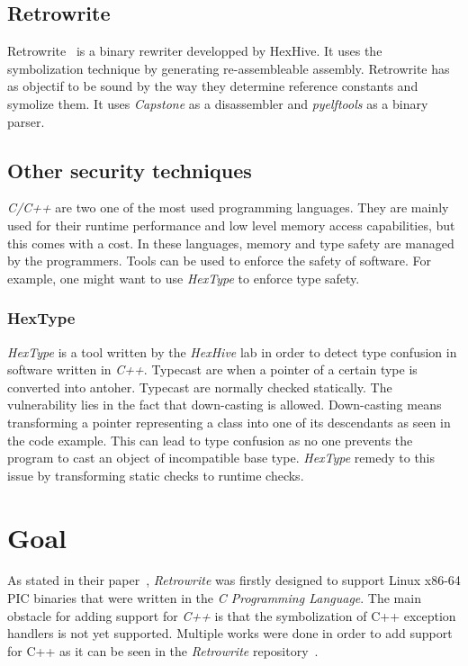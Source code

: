 \documentclass[a4paper,11pt,oneside]{report}
\begin{document}
\section{Retrowrite}
Retrowrite~\cite{dinesh20oakland} is a binary rewriter developped by HexHive.
It uses the symbolization technique by generating re-assembleable assembly.
Retrowrite has as objectif to be sound by the way they determine reference
constants and symolize them. It uses
\textit{Capstone} as a disassembler and \textit{pyelftools} as a binary parser.

\section{Other security techniques}
\textit{C/C++} are two one of the most used programming languages. They are
mainly used for their runtime performance and low level memory access
capabilities, but this comes with a cost. In these languages, memory and type
safety are managed by the programmers. Tools can be used to enforce the safety
of software. For example, one might want to use \textit{HexType} to enforce
type safety.

\subsection{HexType}
\textit{HexType} is a tool written by the \textit{HexHive} lab in order to
detect type confusion in software written in \textit{C++}. Typecast are when a
pointer of a certain type is converted into antoher. Typecast are
normally checked statically. The vulnerability lies in the fact that
down-casting is allowed. Down-casting means transforming a pointer representing
a class into one of its descendants as seen in the code example. This can lead
to type confusion as no one prevents the program to cast an object of
incompatible base type. \textit{HexType} remedy to this issue by transforming
static checks to runtime checks.





\chapter{Goal}
As stated in their paper~\cite{dinesh20oakland}, \textit{Retrowrite} was
firstly designed to support Linux x86-64 PIC binaries that were written in the
\textit{C Programming Language}. The main obstacle for adding support for
\textit{C++} is that the symbolization of C++ exception
handlers is not yet supported. Multiple works were done in order to add support
for C++ as it can be seen in the \textit{Retrowrite} repository~\cite{gitCommit}.
\end{document}
